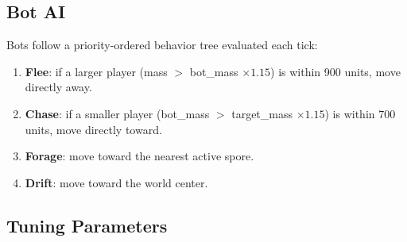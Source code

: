 \documentclass[11pt]{article}
\begin{document}
\subsection{Bot AI}
\label{sec:bot-ai}

Bots follow a priority-ordered behavior tree evaluated each tick:

\begin{enumerate}
  \item \textbf{Flee}: if a larger player (mass $>$ bot\_mass $\times 1.15$) is within 900 units, move directly away.
  \item \textbf{Chase}: if a smaller player (bot\_mass $>$ target\_mass $\times 1.15$) is within 700 units, move directly toward.
  \item \textbf{Forage}: move toward the nearest active spore.
  \item \textbf{Drift}: move toward the world center.
\end{enumerate}

\subsection{Tuning Parameters}
\end{document}
